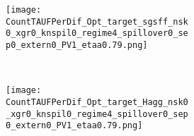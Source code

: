 \begin{figure}[h!!!]
\vspace{3mm}
\begin{subfigure}{1\textwidth}
	\caption{\textbf{Deviation of combined policy from only optimal carbon tax in percent}}\label{fig:opt_Count}
			\vspace{3mm}
	\begin{subfigure}{0.4\textwidth}
		\texttt{[image: CountTAUFPerDif\_Opt\_target\_sgsff\_nsk0\_xgr0\_knspil0\_regime4\_spillover0\_sep0\_extern0\_PV1\_etaa0.79.png]}
	\end{subfigure}	
	\begin{minipage}[]{0.1\textwidth}
		\
	\end{minipage}	
	\begin{subfigure}{0.4\textwidth}
		\texttt{[image: CountTAUFPerDif\_Opt\_target\_Hagg\_nsk0\_xgr0\_knspil0\_regime4\_spillover0\_sep0\_extern0\_PV1\_etaa0.79.png]}
	\end{subfigure}
\end{subfigure}

\end{figure} 

 
\clearpage
